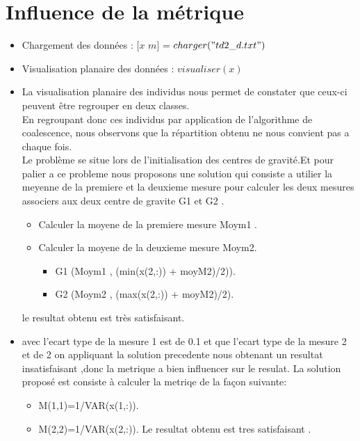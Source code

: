 \documentclass[a4paper,11pt]{article}
\begin{document}
\section{Influence de la métrique}


\begin{itemize}
		\item Chargement des données : $[x$ $m]$ = $charger("td2\_d.txt")$ \\
		\item Visualisation planaire des données : $visualiser(x)$ \\
		\item La visualisation planaire des individus nous permet de constater que ceux-ci peuvent être regrouper en deux classes. \\
             En regroupant donc ces individus par application de l'algorithme de coalescence, nous observons que la répartition obtenu ne nous convient pas a chaque fois.\\
		Le problème se situe lors de l'initialisation des centres de gravité.Et pour palier a ce probleme nous proposons une solution qui consiste a utilier la meyenne de la premiere et la deuxieme          mesure 
             pour calculer les deux mesures associers aux deux centre  de gravite G1 et G2  .
\begin{itemize}
             \item Calculer la moyene de la premiere mesure Moym1 .
              \item Calculer la moyene de la deuxieme mesure Moym2.
          
\begin{itemize}
              \item G1 (Moym1 ,  (min(x(2,:)) + moyM2)/2)).
               \item G2 (Moym2 ,  (max(x(2,:)) + moyM2)/2).
  \end{itemize}

 \end{itemize}
         le resultat obtenu est très satisfaisant.
         \item  avec l'ecart type de la mesure 1 est de 0.1 et que l'ecart type de la mesure 2 et de 2 on appliquant la solution precedente nous obtenant un resultat insatisfaisant ,donc la metrique a bien influencer sur le resulat.
         La solution proposé est consiste à calculer la metriqe de la façon suivante: 
         \begin{itemize}
              \item M(1,1)=1/VAR(x(1,:)).
               \item M(2,2)=1/VAR(x(2,:)).
       Le resultat obtenu est tres satisfaisant .
  \end{itemize}
		\end{itemize}
		
\end{document}
